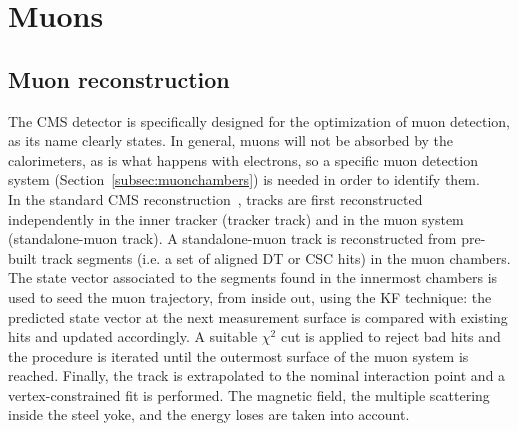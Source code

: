 \section{Muons}\label{sec:muons}

\subsection{Muon reconstruction}

The CMS detector is specifically designed for the optimization of muon detection, as its name clearly states. 
In general, muons will not be absorbed by the calorimeters, as is what happens with electrons, so a specific muon detection system (Section~\ref{subsec:muonchambers}) is needed in order to identify them.\\

In the standard CMS reconstruction~\cite{Chatrchyan:2012xi}, tracks are first reconstructed independently in the inner tracker (tracker track) and in the muon system (standalone-muon track).
A standalone-muon track is reconstructed from pre-built track segments (i.e. a set of aligned DT or CSC hits) in the muon chambers. The state vector associated to the segments found in the innermost chambers is used to seed the muon trajectory, from inside out, using the KF technique: the predicted state vector at the next measurement surface is compared with existing hits and updated accordingly. A suitable $\chi^2$ cut is applied to reject bad hits and the procedure is iterated until the outermost surface of the muon system is reached. Finally, the track is extrapolated to the nominal interaction point and a vertex-constrained fit is performed. The magnetic field, the multiple scattering inside the steel yoke, and the energy loses are taken into account.

